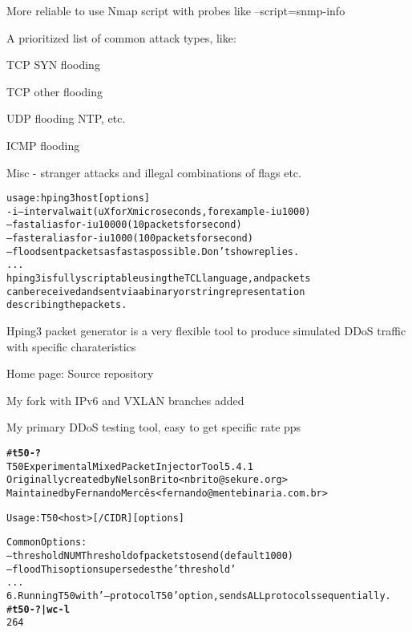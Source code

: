 \documentclass[Screen16to9,17pt]{foils}
\begin{document}
\vskip 5mm
\centerline{More reliable to use Nmap script with probes like --script=snmp-info}


A prioritized list of common attack types, like:

\begin{list2}
\item TCP SYN flooding
\item TCP other flooding
\item UDP flooding NTP, etc.
\item ICMP flooding
\item Misc - stranger attacks and illegal combinations of flags etc.
\end{list2}


\begin{alltt}\footnotesize
usage: hping3 host [options]
  -i  --interval  wait (uX for X microseconds, for example -i u1000)
      --fast      alias for -i u10000 (10 packets for second)
      --faster    alias for -i u1000 (100 packets for second)
      --flood      sent packets as fast as possible. Don't show replies.
...
hping3 is fully scriptable using the TCL language, and packets
can be received and sent via a binary or string representation
describing the packets.
\end{alltt}

\begin{list2}
\item Hping3 packet generator is a very flexible tool to produce simulated DDoS traffic with specific charateristics
\item Home page:  Source repository 
\item My fork with IPv6 and VXLAN branches added 
\end{list2}

\centerline{My primary DDoS testing tool, easy to get specific rate pps}



\begin{alltt}\footnotesize
# {\bf t50 -?}
T50 Experimental Mixed Packet Injector Tool 5.4.1
Originally created by Nelson Brito <nbrito@sekure.org>
Maintained by Fernando Mercês <fernando@mentebinaria.com.br>

Usage: T50 <host> [/CIDR] [options]

Common Options:
    --threshold NUM        Threshold of packets to send     (default 1000)
    --flood                This option supersedes the 'threshold'
...
6. Running T50 with '--protocol T50' option, sends ALL protocols sequentially.
# {\bf t50 -? | wc -l}
264
\end{alltt}
\end{document}
